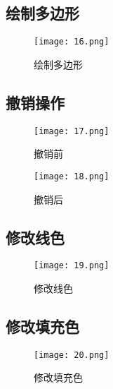 \documentclass[14pt]{scrartcl} %
\begin{document}
\subsection{绘制多边形}

\begin{figure}[h] %
	\centering
	\texttt{[image: 16.png]} %
	\caption{绘制多边形}
\end{figure}

\subsection{撤销操作}

\begin{figure}[h] %
	\begin{minipage}[t]{0.5\linewidth}
		\centering
		\texttt{[image: 17.png]}
		\caption{撤销前}
	\end{minipage}%
	\begin{minipage}[t]{0.5\linewidth}
		\centering
		\texttt{[image: 18.png]}
		\caption{撤销后}
	\end{minipage}
\end{figure}

\pagebreak
\subsection{修改线色}

\begin{figure}[h] %
	\centering
	\texttt{[image: 19.png]} %
	\caption{修改线色}
\end{figure}

\subsection{修改填充色}

\begin{figure}[h] %
	\centering
	\texttt{[image: 20.png]} %
	\caption{修改填充色}
\end{figure}
\end{document}
